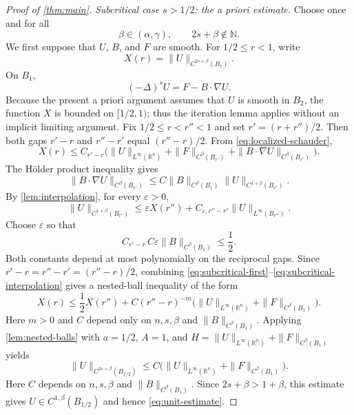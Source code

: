 \documentclass[reqno]{amsart}
\numberwithin{equation}{section}
\theoremstyle{plain}
\theoremstyle{definition}
\theoremstyle{remark}
\newcommand{\R}{\mathbb R}
\newcommand{\rev}[1]{#1}
\begin{document}
\begin{proof}[Proof of \cref{thm:main}]
\smallskip
\noindent\emph{Subcritical case $s>1/2$: the a priori estimate.}
Choose once and for all
\[
 \beta\in(\alpha,\gamma),\qquad 2s+\beta\notin\mathbb N.
\]
We first suppose that $U$, $B$, and $F$ are smooth.  For
$1/2\le r<1$, write
\[
 X(r)=\|U\|_{C^{2s+\beta}(B_r)}.
\]
On $B_1$,
\[
 (-\Delta)^sU=F-B\cdot\nabla U.
\]
Because the present a priori argument assumes that $U$ is smooth in $B_2$,
the function $X$ is bounded on $[1/2,1)$; thus the iteration lemma applies
without an implicit limiting argument.
\rev{Fix $1/2\le r<r''<1$ and set $r'=(r+r'')/2$.  Then both gaps
$r'-r$ and $r''-r'$ equal $(r''-r)/2$.  From
\eqref{eq:localized-schauder},}
\begin{equation}\label{eq:subcritical-first}
 X(r)\le C_{r'-r}\bigl(
 \|U\|_{L^\infty(\R^n)}+\|F\|_{C^\beta(B_{r'})}
 +\|B\cdot\nabla U\|_{C^\beta(B_{r'})}\bigr).
\end{equation}
The H\"older product inequality gives
\begin{equation}\label{eq:product}
 \|B\cdot\nabla U\|_{C^\beta(B_{r'})}
 \le C\|B\|_{C^\beta(B_1)}
       \|U\|_{C^{1+\beta}(B_{r'})}.
\end{equation}
By \cref{lem:interpolation}, for every $\varepsilon>0$,
\begin{equation}\label{eq:subcritical-interpolation}
 \|U\|_{C^{1+\beta}(B_{r'})}
 \le \varepsilon X(r'')
 +C_{\varepsilon,r''-r'}\|U\|_{L^\infty(B_{r''})}.
\end{equation}
\rev{Choose $\varepsilon$ so that
\[
 C_{r'-r}\,C\varepsilon\|B\|_{C^\beta(B_1)}\le\frac12.
\]
Both constants depend at most polynomially on the reciprocal gaps.  Since
$r'-r=r''-r'=(r''-r)/2$, combining
\eqref{eq:subcritical-first}--\eqref{eq:subcritical-interpolation} gives a
nested-ball inequality of the form
\begin{equation}\label{eq:nested}
 X(r)\le\frac12X(r'')
 +C(r''-r)^{-m}\bigl(
 \|U\|_{L^\infty(\R^n)}+\|F\|_{C^\beta(B_1)}\bigr).
\end{equation}
Here $m>0$ and $C$ depend only on $n,s,\beta$ and
$\|B\|_{C^\beta(B_1)}$.}
Applying \cref{lem:nested-balls} with $a=1/2$, $A=1$, and
$H=\|U\|_{L^\infty(\R^n)}+\|F\|_{C^\beta(B_1)}$ yields
\begin{equation}\label{eq:subcritical-schauder}
 \|U\|_{C^{2s+\beta}(B_{1/2})}
 \le C\bigl(
 \|U\|_{L^\infty(\R^n)}+\|F\|_{C^\beta(B_1)}\bigr).
\end{equation}
Here $C$ depends on $n,s,\beta$ and
$\|B\|_{C^\beta(B_1)}$.  Since $2s+\beta>1+\beta$, this estimate gives
$U\in C^{1,\beta}(B_{1/2})$ and hence \eqref{eq:unit-estimate}.


\end{proof}
\end{document}
